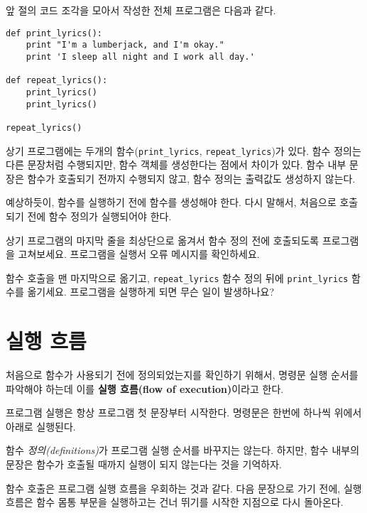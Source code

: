 앞 절의 코드 조각을 모아서 작성한 전체 프로그램은 다음과 같다.

\beforeverb
\begin{verbatim}
def print_lyrics():
    print "I'm a lumberjack, and I'm okay."
    print 'I sleep all night and I work all day.'

def repeat_lyrics():
    print_lyrics()
    print_lyrics()

repeat_lyrics()
\end{verbatim}
\afterverb
%

상기 프로그램에는 두개의 함수(\verb"print_lyrics", \verb"repeat_lyrics")가 있다.
함수 정의는 다른 문장처럼 수행되지만, 함수 객체를 생성한다는 점에서 차이가 있다.
함수 내부 문장은 함수가 호출되기 전까지 수행되지 않고, 함수 정의는 출력값도 생성하지 않는다.


예상하듯이, 함수를 실행하기 전에 함수를 생성해야 한다. 
다시 말해서, 처음으로 호출되기 전에 함수 정의가 실행되어야 한다.

\begin{ex}
상기 프로그램의 마지막 줄을 최상단으로 옮겨서 함수 정의 전에 호출되도록 프로그램을 고쳐보세요.
프로그램을 실행서 오류 메시지를 확인하세요.
\end{ex}

\begin{ex}
함수 호출을 맨 마지막으로 옮기고, \verb"repeat_lyrics" 함수 정의 뒤에 \verb"print_lyrics" 함수를 옮기세요.
프로그램을 실행하게 되면 무슨 일이 발생하나요?
\end{ex}


\section{실행 흐름}

처음으로 함수가 사용되기 전에 정의되었는지를 확인하기 위해서, 
명령문 실행 순서를 파악해야 하는데 이를 {\bf 실행 흐름(flow of execution)}이라고 한다.

프로그램 실행은 항상 프로그램 첫 문장부터 시작한다. 
명령문은 한번에 하나씩 위에서 아래로 실행된다.

함수 \emph{정의(definitions)}가 프로그램 실행 순서를 바꾸지는 않는다. 
하지만, 함수 내부의 문장은 함수가 호출될 때까지 실행이 되지 않는다는 것을 기억하자.

함수 호출은 프로그램 실행 흐름을 우회하는 것과 같다. 
다음 문장으로 가기 전에, 실행 흐름은 함수 몸통 부문을 실행하고는 건너 뛰기를 시작한 지점으로 다시 돌아온다.


